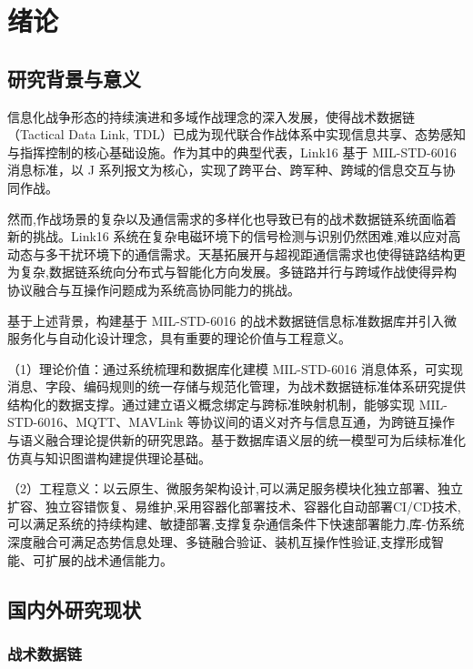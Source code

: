 \chapter{绪论}

\section{研究背景与意义}

信息化战争形态的持续演进和多域作战理念的深入发展，使得战术数据链（Tactical Data Link, TDL）已成为现代联合作战体系中实现信息共享、态势感知与指挥控制的核心基础设施\cite{NDIA_PMW101_2024,NDIA_PMW101_2022}。作为其中的典型代表，{Link16} 基于 MIL-STD-6016 消息标准，以 J 系列报文为核心，实现了跨平台、跨军种、跨域的信息交互与协同作战\cite{DOTE_2022_MIDS_LVT,NAVAIR_MIDS_Overview}。

然而,作战场景的复杂以及通信需求的多样化也导致已有的战术数据链系统面临着新的挑战。{Link16} 系统在复杂电磁环境下的信号检测与识别仍然困难,难以应对高动态与多干扰环境下的通信需求\cite{AviationWeek_SDA_LEO_2024,SDA_Signal_Detection_2023}。天基拓展开与超视距通信需求也使得链路结构更为复杂,数据链系统向分布式与智能化方向发展\cite{MIL_STD_6016_Active_2024,L3Harris_MIDS_JTRS_2021}。多链路并行与跨域作战使得异构协议融合与互操作问题成为系统高协同能力的挑战。

基于上述背景，构建基于 MIL-STD-6016 的战术数据链信息标准数据库并引入微服务化与自动化设计理念，具有重要的理论价值与工程意义。

（1）理论价值：通过系统梳理和数据库化建模 MIL-STD-6016 消息体系，可实现消息、字段、编码规则的统一存储与规范化管理，为战术数据链标准体系研究提供结构化的数据支撑。通过建立语义概念绑定与跨标准映射机制，能够实现 MIL-STD-6016、MQTT、MAVLink 等协议间的语义对齐与信息互通，为跨链互操作与语义融合理论提供新的研究思路。基于数据库语义层的统一模型可为后续标准化仿真与知识图谱构建提供理论基础。

（2）工程意义：以云原生、微服务架构设计,可以满足服务模块化独立部署、独立扩容、独立容错恢复、易维护,采用容器化部署技术、容器化自动部署CI/CD技术,可以满足系统的持续构建、敏捷部署,支撑复杂通信条件下快速部署能力,库-仿系统深度融合可满足态势信息处理、多链融合验证、装机互操作性验证,支撑形成智能、可扩展的战术通信能力。

\section{国内外研究现状}

\subsection{战术数据链}

